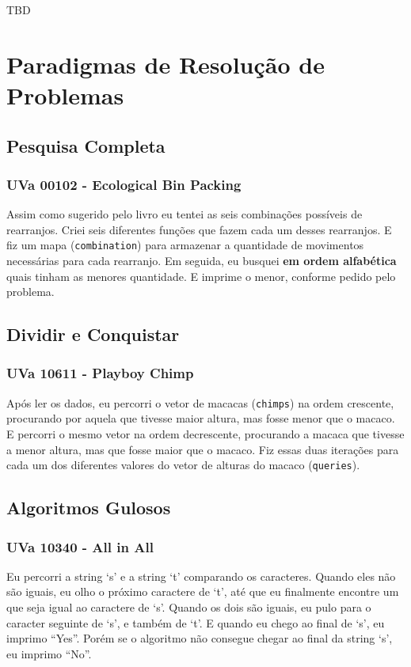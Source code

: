 \documentclass[11pt]{scrartcl}
\newcommand{\code}[1]{\texttt{\colorbox{bg_code_color}{#1}}}
\begin{document}
TBD

\section{Paradigmas de Resolução de Problemas}

\subsection{Pesquisa Completa}
\subsubsection{UVa 00102 - Ecological Bin Packing}
Assim como sugerido pelo livro eu tentei as seis combinações possíveis de rearranjos. Criei seis diferentes funções que fazem cada um desses rearranjos. E fiz um mapa (\code{combination}) para armazenar a quantidade de movimentos necessárias para cada rearranjo. Em seguida, eu busquei \textbf{em ordem alfabética} quais tinham as menores quantidade. E imprime o menor, conforme pedido pelo problema.


\subsection{Dividir e Conquistar}
\subsubsection{UVa 10611 - Playboy Chimp}
Após ler os dados, eu percorri o vetor de macacas (\code{chimps}) na ordem crescente, procurando por aquela que tivesse maior altura, mas fosse menor que o macaco. E percorri o mesmo vetor na ordem decrescente, procurando a macaca que tivesse a menor altura, mas que fosse maior que o macaco. Fiz essas duas iterações para cada um dos diferentes valores do vetor de alturas do macaco (\code{queries}).


\subsection{Algoritmos Gulosos}
\subsubsection{UVa 10340 - All in All}
Eu percorri a string `s' e a string `t' comparando os caracteres. Quando eles não são iguais, eu olho o próximo caractere de `t', até que eu finalmente encontre um que seja igual ao caractere de `s'. Quando os dois são iguais, eu pulo para o caracter seguinte de `s', e também de `t'. E quando eu chego ao final de `s', eu imprimo ``Yes''. Porém se o algoritmo não consegue chegar ao final da string `s', eu imprimo ``No''.

\end{document}
